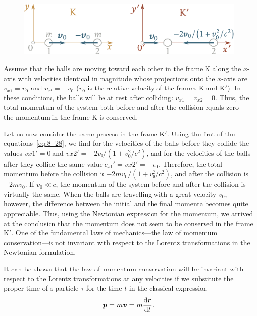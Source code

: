 \begin{figure}[t]
	\begin{center}
		\includegraphics[scale=0.95]{figures/ch_08/fig_8_4.pdf}
		\caption[]{}
		\label{fig:8_4}
	\end{center}
	\vspace{-0.8cm}
\end{figure}

Assume that the balls are moving toward each other in the frame K along the $x$-axis with velocities identical in magnitude whose projections onto the $x$-axis are $v_{x1}=v_0$ and $v_{x2}=-v_0$ ($v_0$ is the relative velocity of the frames K and K$'$). In these conditions, the balls will be at rest after colliding: $v_{x1}=v_{x2}=0$. Thus, the total momentum of the system both before and after the collision equals zero---the momentum in the frame K is conserved.

Let us now consider the same process in the frame K$'$. Using the first of the equations~\eqref{eq:8_28}, we find for the velocities of the balls before they collide the values $v{x1}'=0$ and $v{x2}'=-2v_0/(1+v_0^2/c^2)$, and for the velocities of the balls after they collide the same value $c_{x1}'=v{x2}'=-v_0$. Therefore, the total momentum before the collision is $-2mv_0/(1+v_0^2/c^2)$, and after the collision is $-2mv_0$. If $v_0\ll c$, the momentum of the system before and after the collision is virtually the same. When the balls are travelling with a great velocity $v_0$, however, the difference between the initial and the final momenta becomes quite appreciable. Thus, using the Newtonian expression for the momentum, we arrived at the conclusion that the momentum does not seem to be conserved in the frame K$'$. One of the fundamental laws of mechanics---the law of momentum conservation---is not invariant with respect to the Lorentz transformations in the Newtonian formulation.

It can be shown that the law of momentum conservation will be invariant with respect to the Lorentz transformations at any velocities if we substitute the proper time of a particle $\tau$ for the time $t$ in the classical expression
\begin{equation}\label{eq:8_30}
	\boldsymbol{p} = m\boldsymbol{v} = m\frac{\mathrm{d}\boldsymbol{r}}{\mathrm{d} t}.
\end{equation}


